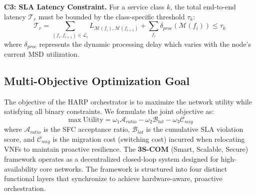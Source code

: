 \documentclass[12pt, a4paper, reqno, oneside]{book}
\begin{document}
\textbf{C3: SLA Latency Constraint.} For a service class $k$, the total end-to-end latency $\mathcal{T}_r$ must be bounded by the class-specific threshold $\tau_k$:
\begin{equation}
\mathcal{T}_r = \sum_{(f_i, f_{i+1}) \in \mathcal{L}_r} L_{\mathcal{M}(f_i), \mathcal{M}(f_{i+1})} + \sum_{f_i} \delta_{proc}(\mathcal{M}(f_i)) \le \tau_k
\end{equation}
where $\delta_{proc}$ represents the dynamic processing delay which varies with the node's current MSD utilization.

\subsection{Multi-Objective Optimization Goal}
The objective of the HARP orchestrator is to maximize the network utility while satisfying all binary constraints. We formulate the joint objective as:
\begin{equation}
\max \text{Utility} = \omega_1 \mathcal{A}_{ratio} - \omega_2 \mathcal{B}_{lat} - \omega_3 \mathcal{C}_{mig}
\end{equation}
where $\mathcal{A}_{ratio}$ is the SFC acceptance ratio, $\mathcal{B}_{lat}$ is the cumulative SLA violation score, and $\mathcal{C}_{mig}$ is the migration cost (switching cost) incurred when relocating VNFs to maintain proactive resilience.
The \textbf{3S-COM} (Smart, Scalable, Secure) framework operates as a decentralized closed-loop system designed for high-availability core networks. The framework is structured into four distinct functional layers that synchronize to achieve hardware-aware, proactive orchestration.
\end{document}
